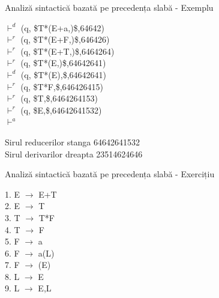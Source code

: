 \documentclass[pdf]{beamer}
\begin{document}
\begin{frame}{Analiză sintactică bazată pe precedența slabă - Exemplu}

$\vdash^{d}$ (q, \$T*(E+a,)\$,64642)
\\ $\vdash^{r}$ (q, \$T*(E+F,)\$,646426)
\\ $\vdash^{r}$ (q, \$T*(E+T,)\$,6464264)
\\ $\vdash^{r}$ (q, \$T*(E,)\$,64642641)
\\ $\vdash^{d}$ (q, \$T*(E),\$,64642641)
\\ $\vdash^{r}$ (q, \$T*F,\$,646426415)
\\ $\vdash^{r}$ (q, \$T,\$,6464264153)
\\ $\vdash^{r}$ (q, \$E,\$,64642641532)
\\ $\vdash^{a}$

Sirul reducerilor stanga 64642641532 \\
Sirul derivarilor dreapta 23514624646

\end{frame}



\begin{frame}{Analiză sintactică bazată pe precedența slabă - Exercițiu}

1. E $\rightarrow$ E+T \\
2. E $\rightarrow$ T    \\
3. T $\rightarrow$ T*F  \\
4. T $\rightarrow$ F    \\ 
5. F $\rightarrow$ a    \\ 
6. F $\rightarrow$ a(L) \\
7. F $\rightarrow$ (E)   \\
8. L $\rightarrow$ E \\
9. L $\rightarrow$ E,L 

\end{frame}



\end{document}
